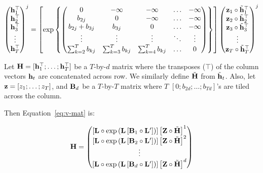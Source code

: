 \documentclass[table]{article}
\begin{document}
\begin{equation}\label{eq:v-mat}
{\begin{pmatrix}
{\bf h}_1^\top \\
{\bf h}_2^\top \\
{\bf h}_3^\top \\
\vdots \\
{\bf h}_T^\top
\end{pmatrix}}^j
 = \left[
 \exp\left\{
    \begin{pmatrix}
        0 & -\infty & -\infty & \ldots & -\infty \\
        b_{2j}  & 0 & -\infty & \ldots & -\infty\\
        b_{2j} + b_{3j}  & b_{3j} & 0 & \ldots & -\infty\\
        \vdots & \vdots & \vdots & \ddots & \vdots\\
        \sum_{k=2}^T b_{kj} & \sum_{k=3}^T b_{kj} & \sum_{k=4}^T b_{kj} &\ldots & 0
    \end{pmatrix}
\right\}
\right]
{\begin{pmatrix}
{\bf z}_1 \circ \tilde{{\bf h}}^\top_1 \\
{\bf z}_2 \circ \tilde{{\bf h}}^\top_2 \\
{\bf z}_3 \circ \tilde{{\bf h}}^\top_3 \\
\vdots \\
{\bf z}_T \circ \tilde{{\bf h}}^\top_T
\end{pmatrix}}^j
\end{equation}


Let ${\bf H} = [{\bf h}_1^\top ; \ldots ; {\bf h}_T^\top]$ 
be a $T$-by-$d$ matrix where the transposes ($\top$) of the column vectors ${\bf h}_t$ are concatenated across row.
We similarly define $\tilde{{\bf H}}$ from $\tilde{{\bf h}}_t$. 
Also, let ${\bf z}=[z_1; \ldots ; z_T]$, and ${\bf B}_d$ be a $T$-by-$T$ matrix where $T$ $[0; b_{2d}; \dots ; b_{Td}]$'s are tiled across the column.

Then Equation~\ref{eq:v-mat} is: 

\begin{equation}\label{eq:v-short}
{\bf H} = \begin{pmatrix}
    \left[ {\bf L} \circ \exp \left( {\bf L}\left[{\bf B}_1 \circ {\bf L}'\right]\right)\right]
        \left[ {\bf Z} \circ \tilde{{\bf H}} \right]^1\\
    \left[ {\bf L} \circ \exp \left( {\bf L}\left[{\bf B}_2 \circ {\bf L}'\right]\right)\right]
        \left[ {\bf Z} \circ \tilde{{\bf H}} \right]^2\\
    \vdots \\
    \left[ {\bf L} \circ \exp \left( {\bf L}\left[{\bf B}_d \circ {\bf L}'\right]\right)\right]
        \left[ {\bf Z} \circ \tilde{{\bf H}} \right]^d
 \end{pmatrix} 
\end{equation}
\end{document}
